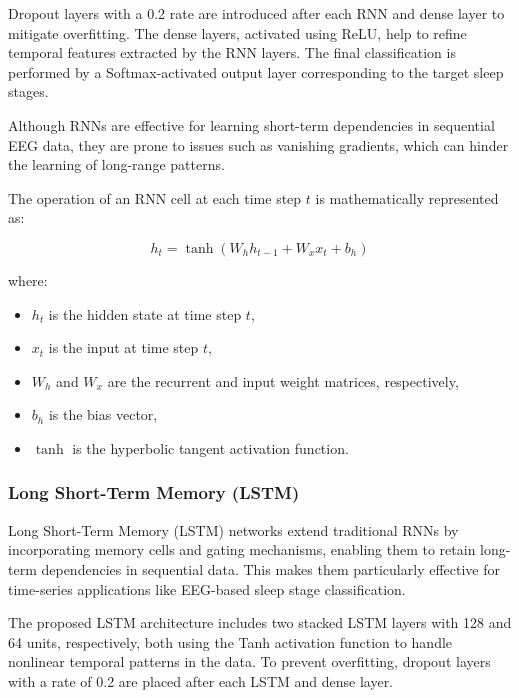Dropout layers with a 0.2 rate are introduced after each RNN and dense layer to mitigate overfitting. The dense layers, activated using ReLU, help to refine temporal features extracted by the RNN layers. The final classification is performed by a Softmax-activated output layer corresponding to the target sleep stages.

Although RNNs are effective for learning short-term dependencies in sequential EEG data, they are prone to issues such as vanishing gradients, which can hinder the learning of long-range patterns.

The operation of an RNN cell at each time step \( t \) is mathematically represented as:

\begin{equation}
	h_t = \tanh(W_h h_{t-1} + W_x x_t + b_h)
\end{equation}

\noindent where:
\begin{itemize}
	\item \( h_t \) is the hidden state at time step \( t \),
	\item \( x_t \) is the input at time step \( t \),
	\item \( W_h \) and \( W_x \) are the recurrent and input weight matrices, respectively,
	\item \( b_h \) is the bias vector,
	\item \( \tanh \) is the hyperbolic tangent activation function.
\end{itemize}



\subsubsection{Long Short-Term Memory (LSTM)}

Long Short-Term Memory (LSTM) networks extend traditional RNNs by incorporating memory cells and gating mechanisms, enabling them to retain long-term dependencies in sequential data. This makes them particularly effective for time-series applications like EEG-based sleep stage classification.

The proposed LSTM architecture includes two stacked LSTM layers with 128 and 64 units, respectively, both using the Tanh activation function to handle nonlinear temporal patterns in the data. To prevent overfitting, dropout layers with a rate of 0.2 are placed after each LSTM and dense layer.

